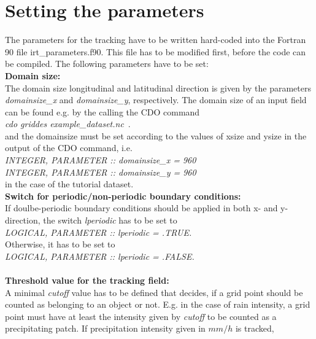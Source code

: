 \documentclass[11pt]{article}
\begin{document}
\section{Setting the parameters}\label{sec_parameters}

The parameters for the tracking have to be written hard-coded into the Fortran 90 file irt\_parameters.f90. This file has to be modified first, before the code can be compiled. The following parameters have to be set:\vspace{0.5cm} \\
{\bf Domain size:}\\
The domain size longitudinal and latitudinal direction is given by the parameters {\it domainsize\_x} and {\it domainsize\_y}, respectively. The domain size of an input field can be found e.g. by the calling the CDO command\\
{\it cdo griddes example\_dataset.nc}\, . \\
and the domainsize must be set according to the values of xsize and ysize in the output of the CDO command, i.e.\\
{\it INTEGER, PARAMETER    :: domainsize\_x = 960}\\
{\it INTEGER, PARAMETER    :: domainsize\_y = 960}\\
in the case of the tutorial dataset.\vspace{0.5cm} \\
{\bf Switch for periodic/non-periodic boundary conditions:}\\
If doulbe-periodic boundary conditions should be applied in both x- and y-direction, the switch {\it lperiodic} has to be set to\\
{\it LOGICAL, PARAMETER    :: lperiodic = .TRUE.}\\
Otherwise, it has to be set to\\
{\it LOGICAL, PARAMETER    :: lperiodic = .FALSE.}\\\vspace{0.5cm} \\
{\bf Threshold value for the tracking field:}\\
A minimal {\it cutoff} value has to be defined that decides, if a grid point should be counted as belonging to an object or not. E.g. in the case of rain intensity, a grid point must have at least the intensity given by {\it cutoff} to be counted as a precipitating patch. If precipitation intensity given in $mm/h$ is tracked,\\
\end{document}
